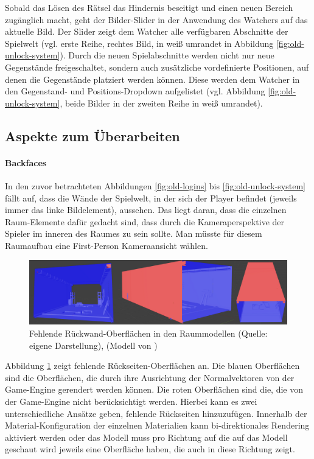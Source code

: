 Sobald das Lösen des Rätsel das Hindernis beseitigt und einen neuen Bereich zugänglich macht, geht der Bilder-Slider in der Anwendung des Watchers auf das aktuelle Bild. Der Slider zeigt dem Watcher alle verfügbaren Abschnitte der Spielwelt (vgl. erste Reihe, rechtes Bild, in weiß umrandet in Abbildung \ref{fig:old-unlock-system}). Durch die neuen Spielabschnitte werden nicht nur neue Gegenstände freigeschaltet, sondern auch zusätzliche vordefinierte Positionen, auf denen die Gegenstände platziert werden können. Diese werden dem Watcher in den Gegenstand- und Positions-Dropdown aufgelistet (vgl. Abbildung \ref{fig:old-unlock-system}, beide Bilder in der zweiten Reihe in weiß umrandet). 

\subsection{Aspekte zum Überarbeiten}
\paragraph{Backfaces}
In den zuvor betrachteten Abbildungen \ref{fig:old-logins} bis \ref{fig:old-unlock-system} fällt auf, dass die Wände der Spielwelt, in der sich der Player befindet (jeweils immer das linke Bildelement),  aussehen. Das liegt daran, dass die einzelnen Raum-Elemente dafür gedacht sind, dass durch die Kameraperspektive der Spieler im inneren des Raumes zu sein sollte. Man müsste für diesem Raumaufbau eine First-Person Kameraansicht wählen.

\begin{figure}[ht]
\centering
\includegraphics[width=1\linewidth]{content/pictures/Backfaces.png}
\caption{Fehlende Rückwand-Oberflächen in den Raummodellen (Quelle: eigene Darstellung), (Modell von \cite{alasl_autolevel_nodate})}
\label{fig:missing-backfaces}
\end{figure}

Abbildung \ref{fig:missing-backfaces} zeigt fehlende Rückseiten-Oberflächen an. Die blauen Oberflächen sind die Oberflächen, die durch ihre Ausrichtung der Normalvektoren von der Game-Engine gerendert werden können. Die roten Oberflächen sind die, die von der Game-Engine nicht berücksichtigt werden. Hierbei kann es zwei unterschiedliche Ansätze geben, fehlende Rückseiten hinzuzufügen. Innerhalb der Material-Konfiguration der einzelnen Materialien kann bi-direktionales Rendering aktiviert werden oder das Modell muss pro Richtung auf die auf das Modell geschaut wird jeweils eine Oberfläche haben, die auch in diese Richtung zeigt.

